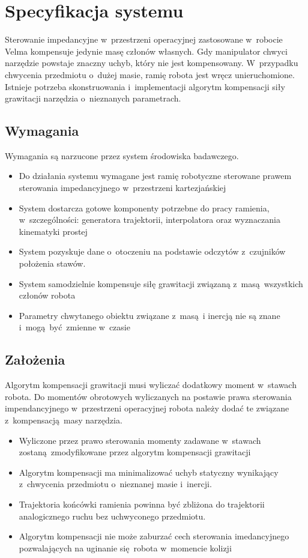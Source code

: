 
\chapter{Specyfikacja systemu \label{chap:specyfikacja_systemu}}
Sterowanie impedancyjne w~przestrzeni operacyjnej zastosowane w~robocie Velma kompensuje jedynie masę członów własnych. Gdy manipulator chwyci narzędzie powstaje znaczny uchyb, który nie jest kompensowany. W~przypadku chwycenia przedmiotu o~dużej masie, ramię robota jest wręcz unieruchomione. Istnieje potrzeba skonstruowania i~implementacji algorytm kompensacji siły grawitacji narzędzia o~nieznanych parametrach. 

\section{Wymagania}
Wymagania są narzucone przez system środowiska badawczego.
\begin{itemize}
	\item Do działania systemu wymagane jest ramię robotyczne sterowane prawem sterowania impedancyjnego w~przestrzeni kartezjańskiej
	\item System dostarcza gotowe komponenty potrzebne do pracy ramienia, w~szczególności: generatora trajektorii, interpolatora oraz wyznaczania kinematyki prostej 
	\item System pozyskuje dane o~otoczeniu na podstawie odczytów z~czujników położenia stawów.
	\item System samodzielnie kompensuje siłę grawitacji związaną z~masą wszystkich członów robota
	\item Parametry chwytanego obiektu związane z~masą i inercją nie są znane i~mogą być zmienne w~czasie
\end{itemize}

\section{Założenia}
Algorytm kompensacji grawitacji musi wyliczać dodatkowy moment w~stawach robota. Do momentów obrotowych wyliczanych na postawie  prawa sterowania impendancyjnego w~przestrzeni operacyjnej robota należy dodać te związane z~kompensacją masy narzędzia.
\begin{itemize}
	\item Wyliczone przez prawo sterowania momenty zadawane w~stawach zostaną zmodyfikowane przez algorytm kompensacji grawitacji
	\item Algorytm kompensacji ma minimalizować uchyb statyczny wynikający z~chwycenia przedmiotu o~nieznanej masie i~inercji.
	\item  Trajektoria końcówki ramienia powinna być zbliżona do trajektorii analogicznego ruchu bez uchwyconego przedmiotu.
	\item Algorytm kompensacji nie może zaburzać cech sterowania imedancyjnego pozwalających na uginanie się robota w~momencie kolizji
\end{itemize}


